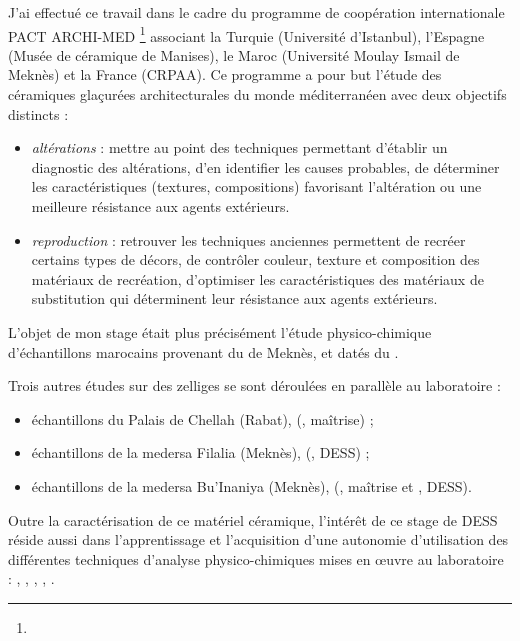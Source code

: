 J'ai effectué ce travail dans le cadre du programme de coopération 
internationale PACT ARCHI-MED 
\footnote{} 
associant la Turquie (Université d'Istanbul), l'Espagne 
(Musée de céramique de Manises), le Maroc (Université Moulay Ismail 
de Meknès) et la France (CRPAA). Ce programme a pour but l'étude des 
céramiques glaçurées architecturales du monde méditerranéen avec deux 
objectifs distincts :

\begin{itemize}
  \item \emph{altérations} : mettre au point des techniques 
        permettant d'établir un diagnostic des altérations, 
        d'en identifier les causes probables, de déterminer les 
        caractéristiques (textures, compositions) favorisant 
        l'altération ou une meilleure résistance aux agents extérieurs.
  \item \emph{reproduction} : retrouver les techniques anciennes 
        permettent de recréer certains types de décors, de contrôler 
        couleur, texture et composition des matériaux de recréation, 
        d'optimiser les caractéristiques des matériaux de substitution 
        qui déterminent leur résistance aux agents extérieurs.
\end{itemize}


L'objet de mon stage était plus précisément l'étude physico-chimique 
d'échantillons marocains  provenant du \PaM de 
Meknès, et datés du .

Trois autres études sur des zelliges se sont déroulées en parallèle au 
laboratoire :

\begin{itemize}
  \item échantillons du Palais de Chellah (Rabat), 
         (, maîtrise) ;
  \item échantillons de la medersa Filalia (Meknès), 
         (, DESS) ;
  \item échantillons de la medersa Bu'Inaniya (Meknès), 
         (, maîtrise et 
        , DESS).
\end{itemize}


Outre la caractérisation de ce matériel céramique, l'intérêt de ce 
stage de DESS réside aussi dans l'apprentissage et l'acquisition 
d'une autonomie d'utilisation des différentes techniques d'analyse 
physico-chimiques mises en {\oe}uvre au laboratoire : \MEB[ie], 
\EDS, \CL, \SAO, \DX.